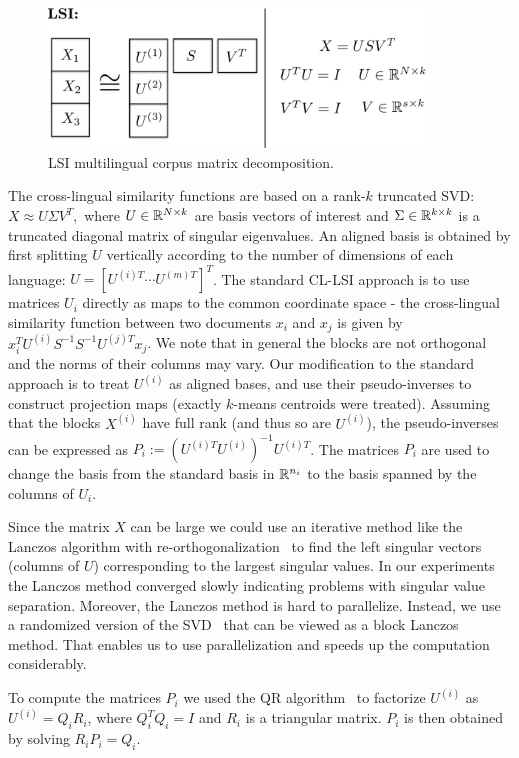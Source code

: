 \begin{figure}[tbp]
\centering
\includegraphics[width=10cm]{figures/lsi.pdf}
\caption{LSI multilingual corpus matrix decomposition.}
\label{fig:lsi}
\end{figure}

The cross-lingual similarity functions are based on a rank-$k$ truncated SVD:
$X \approx U \Sigma V^T,$ where $U \in \mathbb{R}^{N \times k}$ are basis vectors of
interest and $\Sigma \in \mathbb{R}^{k \times k}$ is a truncated diagonal matrix of singular
eigenvalues. An aligned basis is obtained by first splitting $U$ vertically according
to the number of dimensions of each language: $U = [U^{(i)T} \cdots U^{(m)T}]^T$.
The standard CL-LSI approach is to use matrices $U_i$ directly as maps to the common
coordinate space - the cross-lingual similarity function between two documents $x_i$ and
$x_j$ is given by $x_i^T U^{(i)} S^{-1} S^{-1} U^{(j)T} x_j$. We note that in general the blocks
are not orthogonal and the norms of their columns may vary. Our modification to the
standard approach is to treat $U^{(i)}$ as aligned bases, and use their pseudo-inverses
to construct projection maps (exactly $k$-means centroids were treated). Assuming
that the blocks $X^{(i)}$ have full rank (and thus so are $U^{(i)}$), 
the pseudo-inverses can be expressed as $P_i := (U^{(i)T} U^{(i)})^{-1} U^{(i)T}$.
The matrices $P_i$ are used to change the basis from the standard basis in $\mathbb{R}^{n_i}$ to the
basis spanned by the columns of $U_i$.

Since the matrix $X$ can be large we could use an iterative method like the Lanczos
algorithm with re-orthogonalization~\cite{golub} to find the left singular vectors
(columns of $U$) corresponding to the largest singular values. In our experiments
the Lanczos method converged slowly indicating problems with singular value separation. 
Moreover, the Lanczos method is hard to parallelize. Instead, we use a randomized version
of the SVD~\cite{tropp} that can be viewed as a block Lanczos method. That enables us
to use parallelization and speeds up the computation considerably.

To compute the matrices $P_i$ we used the QR algorithm~\cite{golub} to factorize
$U^{(i)}$ as $U^{(i)} = Q_i R_i$, where $Q_i^TQ_i = I$ and $R_i$ is a triangular matrix.
$P_i$ is then obtained by solving $R_i P_i = Q_i$.

